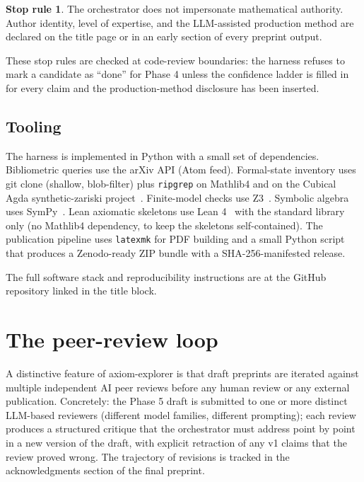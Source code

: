 \documentclass[11pt]{article}
\theoremstyle{definition}
\newtheorem*{stop-rule}{Stop rule}
\theoremstyle{remark}
\begin{document}
\begin{stop-rule}
The orchestrator does not impersonate mathematical authority. Author
identity, level of expertise, and the LLM-assisted production method are
declared on the title page or in an early section of every preprint
output.
\end{stop-rule}

These stop rules are checked at code-review boundaries: the harness
refuses to mark a candidate as ``done'' for Phase 4 unless the
confidence ladder is filled in for every claim and the production-method
disclosure has been inserted.

\subsection{Tooling}\label{sec:tooling}

The harness is implemented in Python with a small set of dependencies.
Bibliometric queries use the arXiv API (Atom feed). Formal-state
inventory uses git clone (shallow, blob-filter) plus
\texttt{ripgrep} on Mathlib4 and on the Cubical Agda
synthetic-zariski project~\cite{SyntheticZariskiRepo}. Finite-model
checks use Z3~\cite{Z3deMouraBjorner2008}. Symbolic algebra uses
SymPy~\cite{SymPy2017}. Lean axiomatic skeletons use Lean
4~\cite{Lean42021Moura} with the standard library only (no Mathlib4
dependency, to keep the skeletons self-contained). The publication
pipeline uses \texttt{latexmk} for PDF building and a small Python
script that produces a Zenodo-ready ZIP bundle with a
SHA-256-manifested release.

The full software stack and reproducibility instructions are at the
GitHub repository linked in the title block.

\section{The peer-review loop}\label{sec:peer-review-loop}

A distinctive feature of axiom-explorer is that draft preprints are
iterated against multiple independent AI peer reviews before any human
review or any external publication. Concretely: the Phase 5 draft is
submitted to one or more distinct LLM-based reviewers (different model
families, different prompting); each review produces a structured
critique that the orchestrator must address point by point in a new
version of the draft, with explicit retraction of any v1 claims that
the review proved wrong. The trajectory of revisions is tracked in the
acknowledgments section of the final preprint.
\end{document}

